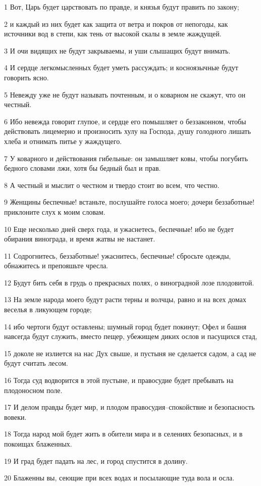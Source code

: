 \par 1 Вот, Царь будет царствовать по правде, и князья будут править по закону;
\par 2 и каждый из них будет как защита от ветра и покров от непогоды, как источники вод в степи, как тень от высокой скалы в земле жаждущей.
\par 3 И очи видящих не будут закрываемы, и уши слышащих будут внимать.
\par 4 И сердце легкомысленных будет уметь рассуждать; и косноязычные будут говорить ясно.
\par 5 Невежду уже не будут называть почтенным, и о коварном не скажут, что он честный.
\par 6 Ибо невежда говорит глупое, и сердце его помышляет о беззаконном, чтобы действовать лицемерно и произносить хулу на Господа, душу голодного лишать хлеба и отнимать питье у жаждущего.
\par 7 У коварного и действования гибельные: он замышляет ковы, чтобы погубить бедного словами лжи, хотя бы бедный был и прав.
\par 8 А честный и мыслит о честном и твердо стоит во всем, что честно.
\par 9 Женщины беспечные! встаньте, послушайте голоса моего; дочери беззаботные! приклоните слух к моим словам.
\par 10 Еще несколько дней сверх года, и ужаснетесь, беспечные! ибо не будет обирания винограда, и время жатвы не настанет.
\par 11 Содрогнитесь, беззаботные! ужаснитесь, беспечные! сбросьте одежды, обнажитесь и препояшьте чресла.
\par 12 Будут бить себя в грудь о прекрасных полях, о виноградной лозе плодовитой.
\par 13 На земле народа моего будут расти терны и волчцы, равно и на всех домах веселья в ликующем городе;
\par 14 ибо чертоги будут оставлены; шумный город будет покинут; Офел и башня навсегда будут служить, вместо пещер, убежищем диких ослов и пасущихся стад,
\par 15 доколе не излиется на нас Дух свыше, и пустыня не сделается садом, а сад не будут считать лесом.
\par 16 Тогда суд водворится в этой пустыне, и правосудие будет пребывать на плодоносном поле.
\par 17 И делом правды будет мир, и плодом правосудия--спокойствие и безопасность вовеки.
\par 18 Тогда народ мой будет жить в обители мира и в селениях безопасных, и в покоищах блаженных.
\par 19 И град будет падать на лес, и город спустится в долину.
\par 20 Блаженны вы, сеющие при всех водах и посылающие туда вола и осла.

